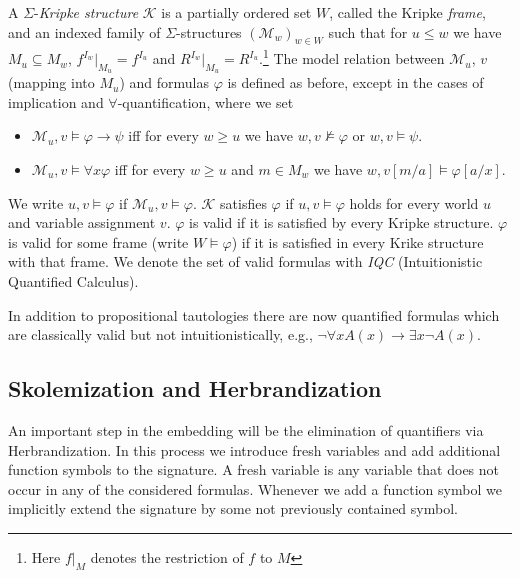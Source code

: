 \documentclass[runningheads]{llncs}
\begin{document}
\begin{definition}
	A $\Sigma$-\emph{Kripke structure} $\mathcal{K}$ is a partially ordered set $W$, called the Kripke \emph{frame}, and an indexed family of $\Sigma$-structures $(\mathcal{M}_w)_{w\in W}$ such that for $u\leq w$ we have $M_u\subseteq M_w$, $f^{I_w}|_{M_u} = f^{I_u}$ and $R^{I_w}|_{M_u} = R^{I_u}$.\footnote{Here $f|_M$ denotes the restriction of $f$ to $M$}
	The model relation between $\mathcal M_u$, $v$ (mapping into $M_u$) and formulas $\varphi$ is defined as before, except in the cases of implication and $\forall$-quantification, where we set
	\begin{itemize}
		\item $\mathcal M_u, v\models \varphi\to\psi$ iff for every $w\geq u$ we have $w, v\not\models\varphi$ or $w, v\models\psi$.
		\item $\mathcal M_u, v\models\forall x\varphi$ iff for every $w\geq u$ and $m\in M_w$ we have $w, v[m/a]\models\varphi[a/x]$.
	\end{itemize}
	We write $u, v\models\varphi$ if $\mathcal M_u, v\models \varphi$. $\mathcal{K}$ satisfies $\varphi$ if $u, v\models\varphi$ holds for every world $u$ and variable assignment $v$. $\varphi$ is valid if it is satisfied by every Kripke structure.
	$\varphi$ is valid for some frame (write $W\models\varphi$) if it is satisfied in every Krike structure with that frame. We denote the set of valid formulas with \emph{IQC} (Intuitionistic Quantified Calculus).
\end{definition}
In addition to propositional tautologies there are now quantified formulas which are classically valid but not intuitionistically, e.g., $\neg\forall x A(x)\to \exists x \neg A(x)$.

\subsection{Skolemization and Herbrandization}\label{section:herbrandiaztion}

An important step in the embedding will be the elimination of quantifiers via Herbrandization.
In this process we introduce fresh variables and add additional function symbols to the signature.
A fresh variable is any variable that does not occur in any of the considered formulas.
Whenever we add a function symbol we implicitly extend the signature by some not previously contained symbol.
\end{document}
